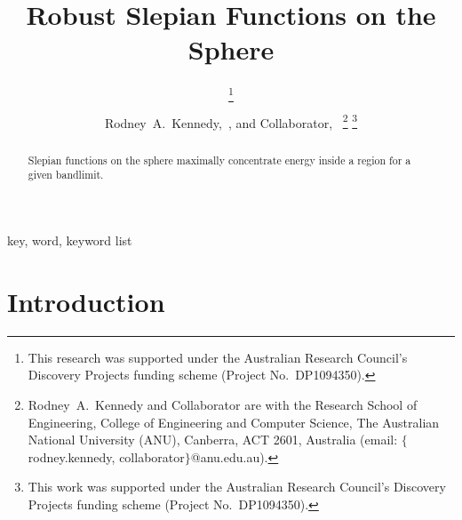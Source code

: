 \documentclass[10pt, twocolumn, twoside]{IEEEtran}
\begin{document}
\title{Robust Slepian Functions on the Sphere}

\ifCLASSOPTIONconference
	\author{
			\thanks{This research was supported under the Australian Research Council's Discovery Projects
				funding scheme (Project No.~DP1094350).}
		 \and
		}
\else
	\author{Rodney~A.~Kennedy,~, and
		Collaborator,~
		\thanks{Rodney~A.~Kennedy and Collaborator are with the Research School of Engineering,
			College of Engineering and Computer Science,
			The Australian National University (ANU), Canberra, ACT 2601, Australia
			(email: $\{$rodney.kennedy, collaborator$\}$@anu.edu.au).}
		\thanks{This work was supported under the Australian Research Council's Discovery Projects
			funding scheme (Project No.~DP1094350).}}
\fi


\maketitle


\begin{abstract}
Slepian functions on the sphere maximally concentrate energy inside a region for a given bandlimit.
\end{abstract}

\smallskip
\begin{IEEEkeywords}
key, word, keyword list
\end{IEEEkeywords}

\IEEEpeerreviewmaketitle

\section{Introduction}
\end{document}
